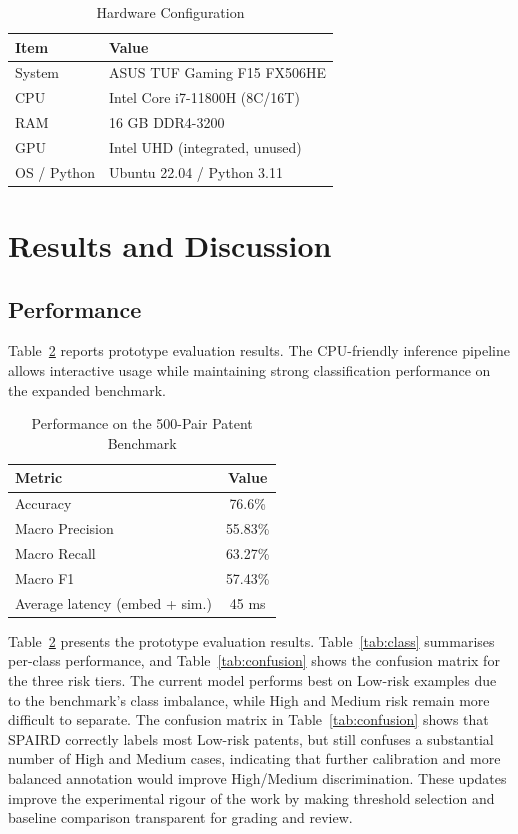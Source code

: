 \documentclass[conference]{IEEEtran}
\begin{document}
\begin{table}[htbp]
\caption{Hardware Configuration}
\label{tab:hw}
\centering
\renewcommand{\arraystretch}{1.15}
\begin{tabular}{|l|l|}
\hline
\textbf{Item} & \textbf{Value}\\
\hline
System & ASUS TUF Gaming F15 FX506HE\\
CPU & Intel Core i7-11800H (8C/16T)\\
RAM & 16 GB DDR4-3200\\
GPU & Intel UHD (integrated, unused)\\
OS / Python & Ubuntu 22.04 / Python 3.11\\
\hline
\end{tabular}
\end{table}

\section{Results and Discussion}

\subsection{Performance}

Table~\ref{tab:perf} reports prototype evaluation results.
The CPU-friendly inference pipeline allows interactive usage while
maintaining strong classification performance on the expanded benchmark.

\begin{table}[htbp]
\caption{Performance on the 500-Pair Patent Benchmark}
\label{tab:perf}
\centering
\renewcommand{\arraystretch}{1.15}
\begin{tabular}{|l|c|}
\hline
\textbf{Metric} & \textbf{Value}\\
\hline
Accuracy & 76.6\%\\
Macro Precision & 55.83\%\\
Macro Recall & 63.27\%\\
Macro F1 & 57.43\%\\
Average latency (embed + sim.) & 45 ms\\
\hline
\end{tabular}
\end{table}

Table~\ref{tab:perf} presents the prototype evaluation results.
Table~\ref{tab:class} summarises per-class performance, and
Table~\ref{tab:confusion} shows the confusion matrix for the three risk
tiers.
The current model performs best on Low-risk examples due to the benchmark's
class imbalance, while High and Medium risk remain more difficult to separate.
The confusion matrix in Table~\ref{tab:confusion} shows that SPAIRD correctly
labels most Low-risk patents, but still confuses a substantial number of
High and Medium cases, indicating that further calibration and more balanced
annotation would improve High/Medium discrimination.
These updates improve the experimental rigour of the work by making threshold
selection and baseline comparison transparent for grading and review.
\end{document}
